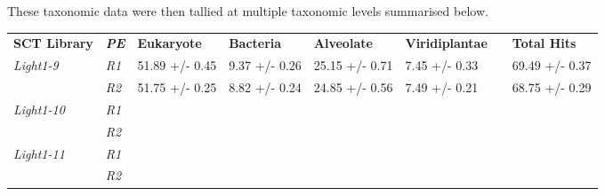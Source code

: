 These taxonomic data were then tallied at multiple taxonomic levels summarised below.




\begin{table}[h]
\begin{tabular}{@{}|l|l|llllll@{}}
\toprule
\textbf{SCT Library} & \textit{\textbf{PE}} & \multicolumn{1}{l|}{\textbf{Eukaryote}} & \multicolumn{1}{l|}{\textbf{Bacteria}} & \multicolumn{1}{l|}{\textbf{Alveolate}} & \multicolumn{1}{l|}{\textbf{Viridiplantae}} & \multicolumn{1}{l|}{} & \multicolumn{1}{l|}{\textbf{Total Hits}} \\ \cmidrule(r){1-6} \cmidrule(l){8-8} 
\textit{Light1-9}    & \textit{R1}          & \multicolumn{1}{l|}{51.89 +/- 0.45}     & \multicolumn{1}{l|}{9.37 +/- 0.26}     & \multicolumn{1}{l|}{25.15 +/-  0.71}    & \multicolumn{1}{l|}{7.45 +/- 0.33}          & \multicolumn{1}{l|}{} & 69.49 +/- 0.37                           \\ \cmidrule(lr){2-2}
                     & \textit{R2}          & 51.75 +/- 0.25                          & 8.82 +/- 0.24                          & 24.85 +/- 0.56                          & 7.49 +/- 0.21                               &                       & 68.75 +/- 0.29                           \\ \cmidrule(r){1-2}
\textit{Light1-10}   & \textit{R1}          &                                         &                                        &                                         & \multicolumn{1}{l|}{}                       & \multicolumn{1}{l|}{} &                                          \\ \cmidrule(lr){2-2}
                     & \textit{R2}          &                                         &                                        &                                         &                                             &                       &                                          \\ \cmidrule(r){1-2}
\textit{Light1-11}   & \textit{R1}          &                                         &                                        &                                         & \multicolumn{1}{l|}{}                       & \multicolumn{1}{l|}{} &                                          \\ \cmidrule(lr){2-2}
                     & \textit{R2}          &                                         &                                        &                                         &                                             &                       &                                          \\ \cmidrule(r){1-2}

\end{tabular}
\end{table}
